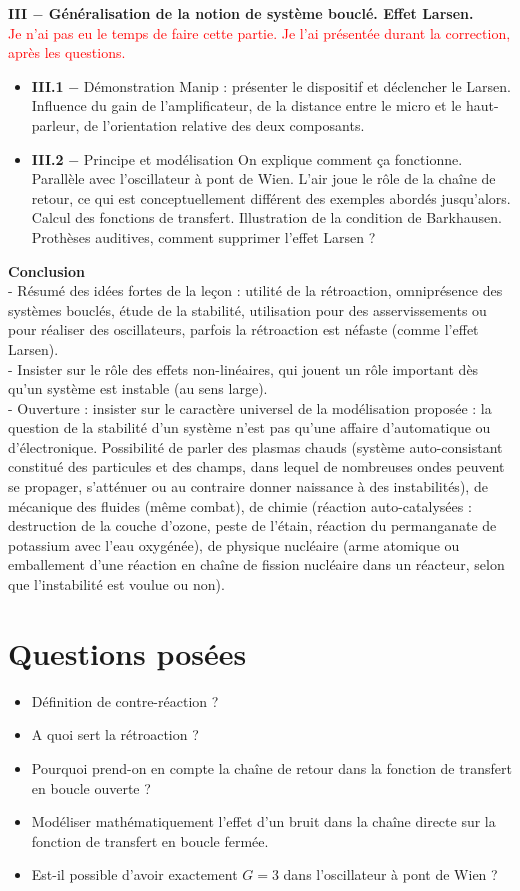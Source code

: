 \documentclass[11pt,a4paper]{report}
\begin{document}
\textbf{III $-$ Généralisation de la notion de système bouclé. Effet Larsen.}\\
\textcolor{red}{Je n'ai pas eu le temps de faire cette partie. Je l'ai présentée durant la correction, après les questions.}
\begin{itemize}
		\item \textbf{III.1} $-$ Démonstration
		Manip : présenter le dispositif et déclencher le Larsen. Influence du gain de l'amplificateur, de la distance entre le micro et le haut-parleur, 
		de l'orientation relative des deux composants.
		\item \textbf{III.2} $-$ Principe et modélisation
		On explique comment ça fonctionne. Parallèle avec l'oscillateur à pont de Wien. L'air joue le rôle de la chaîne de retour, ce qui est conceptuellement différent des exemples abordés jusqu'alors. Calcul des fonctions de transfert. Illustration de la condition de Barkhausen. Prothèses auditives, comment supprimer l'effet Larsen ?\\
\end{itemize}

\textbf{Conclusion}\\
- Résumé des idées fortes de la leçon : utilité de la rétroaction, omniprésence des systèmes bouclés, étude de la stabilité, utilisation pour des asservissements ou pour réaliser des oscillateurs, parfois la rétroaction est néfaste (comme l'effet Larsen).\\
- Insister sur le rôle des effets non-linéaires, qui jouent un rôle important dès qu'un système est instable (au sens large).\\
- Ouverture : insister sur le caractère universel de la modélisation proposée : la question de la stabilité d'un système n'est pas qu'une affaire d'automatique ou d'électronique. Possibilité de parler des plasmas chauds (système auto-consistant constitué des particules et des champs, dans lequel de nombreuses ondes peuvent se propager, s'atténuer ou au contraire donner naissance à des instabilités), de mécanique des fluides (même combat), de chimie (réaction auto-catalysées : destruction de la couche d'ozone, peste de l'étain, réaction du permanganate de potassium avec l'eau oxygénée), de physique nucléaire (arme atomique ou emballement d'une réaction en chaîne de fission nucléaire dans un réacteur, selon que l'instabilité est voulue ou non).

\newpage
\section*{Questions posées}
\begin{itemize}
	\item Définition de contre-réaction ?
	\item A quoi sert la rétroaction ?
	\item Pourquoi prend-on en compte la chaîne de retour dans la fonction de transfert en boucle ouverte ?
	\item Modéliser mathématiquement l'effet d'un bruit dans la chaîne directe sur la fonction de transfert en boucle fermée.
	\item Est-il possible d'avoir exactement $G = 3$ dans l'oscillateur à pont de Wien ?
\end{itemize}
\end{document}
